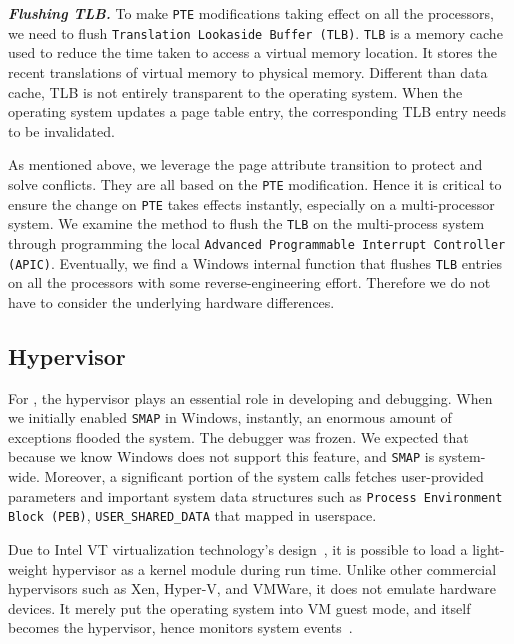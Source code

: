 \textbf{\textit{Flushing TLB.}} To make \texttt{PTE} modifications taking effect on all the processors, we need to flush \texttt{Translation Lookaside Buffer (TLB)}. \texttt{TLB} is a memory cache used to reduce the time taken to access a virtual memory location. It stores the recent translations of virtual memory to physical memory. Different than data cache, TLB is not entirely transparent to the operating system. When the operating system updates a page table entry, the corresponding TLB entry needs to be invalidated.  

As mentioned above, we leverage the page attribute transition to protect and solve conflicts. They are all based on the \texttt{PTE} modification. Hence it is critical to ensure the change on \texttt{PTE} takes effects instantly, especially on a multi-processor system. We examine the method to flush the \texttt{TLB} on the multi-process system through programming the local \texttt{Advanced Programmable Interrupt Controller (APIC)}. Eventually, we find a Windows internal function that flushes \texttt{TLB} entries on all the processors with some reverse-engineering effort. Therefore we do not have to consider the underlying hardware differences.



\subsection{Hypervisor}


For \name, the hypervisor plays an essential role in developing and debugging. When we initially enabled \texttt{SMAP} in Windows, instantly, an enormous amount of exceptions flooded the system. The debugger was frozen.  We expected that because we know Windows does not support this feature, and \texttt{SMAP} is system-wide. Moreover, a significant portion of the system calls fetches user-provided parameters and important system data structures such as \texttt{Process Environment Block (PEB)}, \texttt{USER\_SHARED\_DATA} that mapped in userspace. 


Due to Intel VT virtualization technology's design~\cite{neiger2006intel}, it is possible to load a light-weight hypervisor as a kernel module during run time. Unlike other commercial hypervisors such as Xen, Hyper-V, and VMWare, it does not emulate hardware devices. It merely put the operating system into VM guest mode, and itself becomes the hypervisor, hence monitors system events~\cite{howtohide}.


